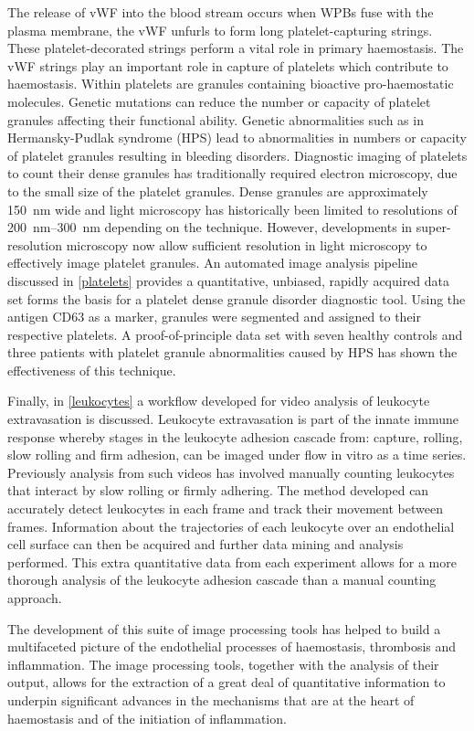 The release of vWF into the blood stream occurs when WPBs fuse with the plasma membrane, the vWF unfurls to form long platelet-capturing strings. These platelet-decorated strings perform a vital role in primary haemostasis. The vWF strings play an important role in capture of platelets which contribute to haemostasis. Within platelets are granules containing bioactive pro-haemostatic molecules. Genetic mutations can reduce the number or capacity of platelet granules affecting their functional ability. Genetic abnormalities such as in Hermansky-Pudlak syndrome (HPS) lead to abnormalities in numbers or capacity of platelet granules resulting in bleeding disorders. Diagnostic imaging of platelets to count their dense granules has traditionally required electron microscopy, due to the small size of the platelet granules. Dense granules are approximately \SI{150}{\nano\metre} wide and light microscopy has historically been limited to resolutions of \SIrange{200}{300}{\nano\metre} depending on the technique. However, developments in super-resolution microscopy now allow sufficient resolution in light microscopy to effectively image platelet granules. An automated image analysis pipeline discussed in \autoref{platelets} provides a quantitative, unbiased, rapidly acquired data set forms the basis for a platelet dense granule disorder diagnostic tool. Using the antigen CD63 as a marker, granules were segmented and assigned to their respective platelets. A proof-of-principle data set with seven healthy controls and three patients with platelet granule abnormalities caused by HPS has shown the effectiveness of this technique.

Finally, in \autoref{leukocytes} a workflow developed for video analysis of leukocyte extravasation is discussed. Leukocyte extravasation is part of the innate immune response whereby stages in the leukocyte adhesion cascade from: capture, rolling, slow rolling and firm adhesion, can be imaged under flow in vitro as a time series. Previously analysis from such videos has involved manually counting leukocytes that interact by slow rolling or firmly adhering. The method developed can accurately detect leukocytes in each frame and track their movement between frames. Information about the trajectories of each leukocyte over an endothelial cell surface can then be acquired and further data mining and analysis performed. This extra quantitative data from each experiment allows for a more thorough analysis of the leukocyte adhesion cascade than a manual counting approach.

The development of this suite of image processing tools has helped to build a multifaceted picture of the endothelial processes of haemostasis, thrombosis and inflammation. The image processing tools, together with the analysis of their output, allows for the extraction of a great deal of quantitative information to underpin significant advances in the mechanisms that are at the heart of haemostasis and of the initiation of inflammation.
